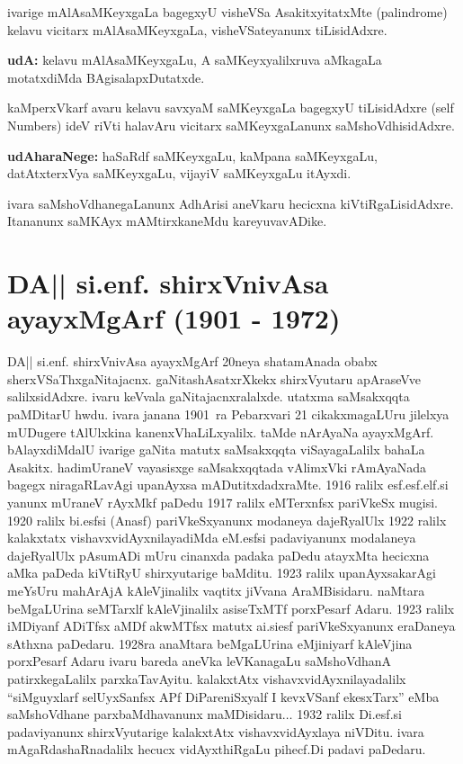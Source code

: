 ivarige mAlAsaMKeyxgaLa bagegxyU visheVSa AsakitxyitatxMte {\rm (palindrome)}
kelavu vicitarx mAlAsaMKeyxgaLa, visheVSateyanunx tiLisidAdxre.

\textbf{udA:} kelavu mAlAsaMKeyxgaLu, A saMKeyxyalilxruva aMkagaLa motatxdiMda BAgisalapx\-Dutatxde.

kaMperxVkarf avaru kelavu savxyaM saMKeyxgaLa bagegxyU tiLisidAdxre {\rm (self Numbers)}
 ideV riVti halavAru vicitarx saMKeyxgaLanunx saMshoVdhisidAdxre. 

\textbf{udAharaNege:} haSaRdf saMKeyxgaLu, kaMpana saMKeyxgaLu, datAtxterxVya saMKeyxgaLu, vijayiV saMKeyxgaLu itAyxdi.

ivara saMshoVdhanegaLanunx AdhArisi aneVkaru hecicxna kiVtiRgaLisidAdxre. Itananunx saMKAyx mAMtirxkaneMdu kareyuvavADike.

\section{{\protect\bf DA|| si.enf. shirxVnivAsa ayayxMgArf {\rm (1901 - 1972)}}}

DA|| si.enf. shirxVnivAsa ayayxMgArf {\rm 20}neya shatamAnada obabx sherxVSaThxgaNitajacnx. gaNita\-shAsatxrXkekx shirxVyutaru apAraseVve salilxsidAdxre. ivaru keVvala gaNitajacnxralalxde. utatxma saMsakxqqta paMDitarU hwdu. ivara janana {\rm 1901}~ra Pebarxvari {\rm 21} cikakxmagaLUru jilelxya mUDugere tAlUlxkina kanenxVhaLiLxyalilx. taMde nArAyaNa ayayxMgArf. bAlayx\-diMdalU ivarige gaNita matutx saMsakxqqta viSayagaLalilx bahaLa Asakitx. hadimUraneV vayasisxge saMsakxqq\-tada vAlimxVki rAmAyaNada bagegx niragaRLavAgi upanAyxsa mADutitxdadxraMte. {\rm 1916} ralilx esf.esf.elf.si yanunx mUraneV rAyxMkf paDedu {\rm 1917} ralilx eMTerxnfsx pariVkeSx mugisi. {\rm 1920} ralilx bi.esfsi (Anasf) pariVkeSxyanunx modaneya dajeRyalUlx {\rm 1922} ralilx kalakxtatx vishavxvidAyxnilayadiMda eM.esfsi padaviyanunx modalaneya dajeRyalUlx pAsumADi mUru cinanxda padaka paDedu atayxMta hecicxna aMka paDeda kiVtiRyU shirxyutarige baMditu. {\rm 1923} ralilx upanAyxsakarAgi meYsUru mahArAjA kAleVjinalilx vaqtitx jiVvana AraMBisidaru. naMtara beMgaLUrina seMTarxlf kAleVjinalilx asiseTxMTf porxPesarf Adaru. {\rm 1923} ralilx iMDiyanf ADiTfsx aMDf akwMTfsx matutx ai.siesf pariVkeSxyanunx eraDaneya sAthxna paDedaru. {\rm 1928}ra anaMtara beMgaLUrina eMjiniyarf kAleVjina porxPesarf Adaru ivaru bareda aneVka leVKanagaLu saMshoVdhanA patirxkegaLalilx parxkaTavAyitu. kalakxtAtx vishavxvidAyxnilayadalilx ``siMguyxlarf selUyxSanfsx APf DiPareniSxyalf I kevxVSanf ekesxTarx'' eMba saMshoVdhane parxbaMdhavanunx maMDisidaru$\ldots$ {\rm 1932} ralilx Di.esf.si padaviyanunx shirxVyutarige kalakxtAtx vishavxvidAyxlaya niVDitu. ivara mAgaRdashaRnadalilx hecucx vidAyxthiRgaLu pihecf.Di padavi paDedaru.

